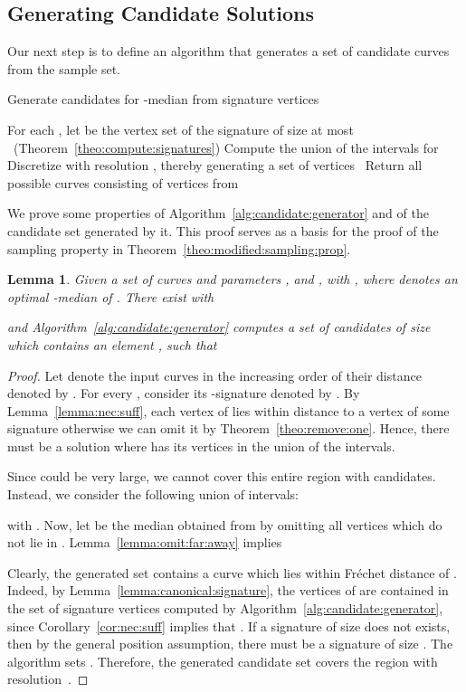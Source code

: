 \documentclass[11pt, letter]{article}
\newtheorem{lemma}[theorem]{Lemma}
\newcommand{\thmref}[1]{Theorem~\ref{theo:#1}}
\newcommand{\lemlab}[1]{\label{lemma:#1}}
\newcommand{\lemref}[1]{Lemma~\ref{lemma:#1}}
\newcommand{\alglab}[1]{\label{alg:#1}}
\newcommand{\algref}[1]{Algorithm~\ref{alg:#1}}
\newcommand{\corref}[1]{Corollary~\ref{cor:#1}}
\newcommand{\Frechet}{Fr\'echet\xspace}
\begin{document}
\subsection{Generating Candidate Solutions}

Our next step is to define an algorithm that generates a set of candidate curves from the 
sample set. 

\begin{algorithm}[h]\alglab{candidate:generator}
 \caption{Generate candidates for -median from signature vertices}
For each , let  be the vertex set of the 
signature of size at most ~(\thmref{compute:signatures})\; 
Compute the union  of the intervals  for \; 
Discretize  with resolution , thereby generating a set of vertices~\;
Return all possible curves consisting of  vertices from
\;
\end{algorithm}

We prove some properties of \algref{candidate:generator} and of the candidate
set generated by it. This proof serves as a basis for the proof of the sampling
property in \thmref{modified:sampling:prop}. 


\begin{lemma}\lemlab{candidate:generator}
Given a set of curves  and parameters
, and , with 
, where  denotes an optimal -median of . 
There exist  with
 
and 
\algref{candidate:generator} computes a set of candidates 
of size  
which contains an element , such that 

\end{lemma}

\begin{proof}
Let  denote the input curves in the increasing order of their
distance denoted by . For every ,
consider its -signature denoted by .   
By \lemref{nec:suff}, each vertex of
 lies within distance  to a vertex of some signature
 otherwise we can omit it by \thmref{remove:one}.  Hence, there must be a solution where
 has its vertices in the union of the intervals. 
 

Since  could be very large, we cannot cover this entire region with candidates. 
Instead, we consider the following union of intervals: 

with .
Now, let  be the median obtained from  by
omitting all vertices which do not lie in . 
\lemref{omit:far:away} implies 

Clearly, the generated set contains a curve 
which lies within \Frechet distance  of . 
Indeed, by \lemref{canonical:signature}, the vertices of  are contained in
the set of signature vertices computed by \algref{candidate:generator}, since 
\corref{nec:suff} implies that 
.  
If a signature of size  does not
exists, then by the general position assumption, there must be a signature of
size .
The algorithm sets . 
Therefore, the generated candidate set covers the region  with resolution~.
\end{proof}
\end{document}
